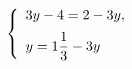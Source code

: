 \begin{ex}
	\begin{condition}
		\( \left\{
		\begin{array}{l}
			3y-4=2-3y,\vspace{0,2cm}\\
			y=1\dfrac{1}{3}-3y
		\end{array}
		\right. \)
	\end{condition}
\end{ex}
